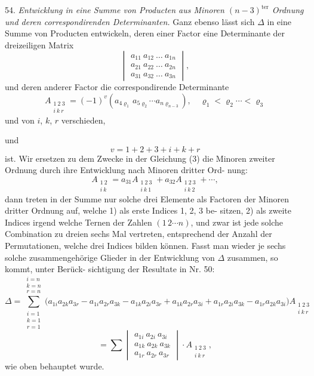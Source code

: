 \documentclass[11pt]{article}
\providecommand{\weberpage}[1]{}
\let\Delta\varDelta
\begin{document}
\weberpage{61}
54. \textit{Entwicklung in eine Summe von Producten aus Minoren $(n-3)^{\text{ter}}$
Ordnung und deren correspondirenden Determinanten.} Ganz ebenso lässt
sich $\Delta$ in eine Summe von Producten entwickeln, deren einer Factor
eine Determinante der dreizeiligen Matrix
\[
\begin{vmatrix}
a_{11}\ a_{12}\ \ldots\ a_{1n} \\
a_{21}\ a_{22}\ \ldots\ a_{2n} \\
a_{31}\ a_{32}\ \ldots\ a_{3n}
\end{vmatrix},
\]
und deren anderer Factor die correspondirende Determinante
\[
A_{\substack{1\ 2\ 3\\ i\ k\ r}} = (-1)^{v}\left(a_{4\varrho_1}\, a_{5\varrho_2}\cdots a_{n\varrho_{n-3}}\right), \quad \varrho_1 < \varrho_2 \cdots < \varrho_3
\]
und von $i$, $k$, $r$ verschieden,

und
\[
v = 1+2+3+i+k+r
\]
ist. Wir ersetzen zu dem Zwecke in der Gleichung (3) die Minoren
zweiter Ordnung durch ihre Entwicklung nach Minoren dritter Ord-
nung:
\[
A_{\substack{1\ 2\\ i\ k}} = a_{31}A_{\substack{1\ 2\ 3\\ i\ k\ 1}} + a_{32}A_{\substack{1\ 2\ 3\\ i\ k\ 2}} + \cdots,
\]
dann treten in der Summe nur solche drei Elemente als Factoren der
Minoren dritter Ordnung auf, welche 1) als erste Indices 1, 2, 3 be-
sitzen, 2) als zweite Indices irgend welche Ternen der Zahlen $(1\,2\cdots n)$,
und zwar ist jede solche Combination zu dreien sechs Mal vertreten,
entsprechend der Anzahl der Permutationen, welche drei Indices bilden
können. Fasst man wieder je sechs solche zusammengehörige Glieder
in der Entwicklung von $\Delta$ zusammen, so kommt, unter Berück-
sichtigung der Resultate in Nr. 50:
\[
\Delta = \sum_{\substack{i=1\\ k=1\\ r=1}}^{\substack{i=n\\ k=n\\ r=n}} \bigl(a_{1i}a_{2k}a_{3r} - a_{1i}a_{2r}a_{3k} - a_{1k}a_{2i}a_{3r} + a_{1k}a_{2r}a_{3i} %
+ a_{1r}a_{2i}a_{3k} - a_{1r}a_{2k}a_{3i}\bigr)A_{\substack{1\ 2\ 3\\ i\ k\ r}}
\]
\[
= \sum \begin{vmatrix} a_{1i}\ a_{2i}\ a_{3i} \\ a_{1k}\ a_{2k}\ a_{3k} \\ a_{1r}\ a_{2r}\ a_{3r} \end{vmatrix} \cdot A_{\substack{1\ 2\ 3\\ i\ k\ r}},
\]
wie oben behauptet wurde.
\end{document}
